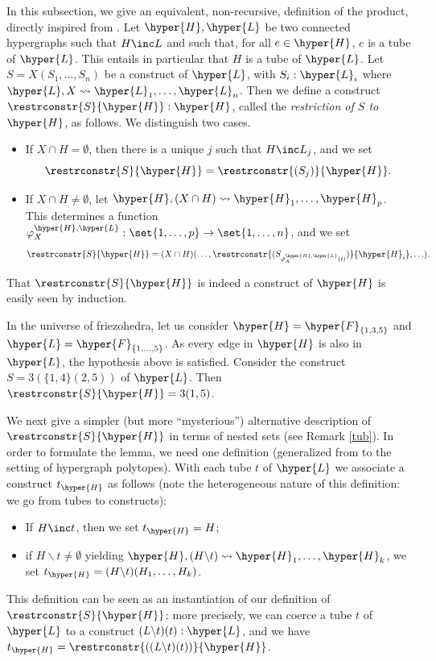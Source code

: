 In this subsection, we give an equivalent, non-recursive, definition of the product, directly inspired from \cite{RoncoGTO}. 
 Let $\hyper{H},\hyper{L}$ be two connected hypergraphs such that $H\inc L$ and such that, for all $e\in\hyper{H}$, $e$ is a tube of  $\hyper{L}$. This entails in particular that $H$ is a tube of  $\hyper{L}$. Let $S=X(S_1,\ldots,S_n)$  be a construct of $\hyper{L}$, with $S_i:\hyper{L}_i$ where $\hyper{L},X\leadsto\hyper{L}_1,\ldots,\hyper{L}_n$. Then we define a construct $\restrconstr{S}{\hyper{H}}:\hyper{H}$, called the {\em restriction of $S$ to} $\hyper{H}$, as follows. We distinguish two cases.
\begin{itemize}
\item
If $X\cap H=\emptyset$, then there is a unique $j$ such that
$H\inc L_j$, and we set $$\restrconstr{S}{\hyper{H}}=\restrconstr{(S_j)}{\hyper{H}}.$$
\item
If $X\cap H\neq\emptyset$, let $\hyper{H},(X\cap H)\leadsto \hyper{H}_1,\ldots,\hyper{H}_p$. This determines a function $\varphi_X^{\hyper{H},\hyper{L}}:\set{1,\ldots,p}\rightarrow\set{1,\ldots,n}$, and we set  $$\restrconstr{S}{\hyper{H}}=(X\cap H)(\ldots,\restrconstr{(S_{\varphi_X^{\hyper{H},\hyper{L}}(i)})}{\hyper{H}_i},\ldots).$$
\end{itemize}
That  $\restrconstr{S}{\hyper{H}}$ is indeed a construct of $\hyper{H}$ is easily seen by induction.   

\begin{example} \label{4.19} In the universe of friezohedra, let us consider $\hyper{H}=\hyper{F}_{\{1, 3, 5\}}$ and $\hyper{L}=\hyper{F}_{\{1, \ldots, 5\}}$. As every edge in $\hyper{H}$ is also in $\hyper{L}$, the hypothesis above is satisfied. Consider the construct $S=3(\{1,4\}(2,5))$ of $\hyper{L}$. Then $\restrconstr{S}{\hyper{H}}=3(1,5)$. \demo
\end{example}

We next give a simpler (but more ``mysterious'')  alternative description of  $\restrconstr{S}{\hyper{H}}$ in terms of nested sets (see Remark \ref{tub}). In order to formulate the lemma, we need one definition (generalized from \cite{RoncoGTO} to the setting of hypergraph polytopes). With each tube $t$  of $\hyper{L}$ we associate a construct $t_{\hyper{H}}$ as follows (note the heterogeneous nature of this definition: we go from tubes to constructs):
\begin{itemize}
\item If $H\inc t$, then we set $t_{\hyper{H}}=H$;
\item if $H\backslash t\neq\emptyset$ yielding $\hyper{H},(H\backslash t)\leadsto \hyper{H}_1,\ldots,\hyper{H}_k$, we set $t_{\hyper{H}}=(H\backslash t)(H_1,\ldots,H_k)$. 
\end{itemize}
This definition can be seen as an instantiation of our definition of $\restrconstr{S}{\hyper{H}}$: more precisely, we can coerce a tube $t$ of $\hyper{L}$ to a construct  $(L\backslash t)(t):\hyper{L}$, and we have 
$t_{\hyper{H}} = \restrconstr{((L\backslash t)(t))}{\hyper{H}}$.

